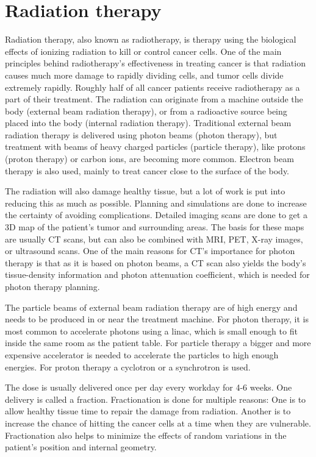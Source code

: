 \documentclass[../main/thesis.tex]{subfiles}
\begin{document}
\section{Radiation therapy}
\label{t-therapy}
Radiation therapy, also known as radiotherapy, is therapy using the biological effects of ionizing radiation to kill or control cancer cells. One of the main principles behind radiotherapy's effectiveness in treating cancer is that radiation causes much more damage to rapidly dividing cells, and tumor cells divide extremely rapidly. \citep[chap. 45]{Serway} Roughly half of all cancer patients receive radiotherapy as a part of their treatment. The radiation can originate from a machine outside the body (external beam radiation therapy), or from a radioactive source being placed into the body (internal radiation therapy). Traditional external beam radiation therapy is delivered using photon beams (photon therapy), but treatment with beams of heavy charged particles (particle therapy), like protons (proton therapy) or carbon ions, are becoming more common. Electron beam therapy is also used, mainly to treat cancer close to the surface of the body. \citep{nih}

The radiation will also damage healthy tissue, but a lot of work is put into reducing this as much as possible. Planning and simulations are done to increase the certainty of avoiding complications. Detailed imaging scans are done to get a 3D map of the patient's tumor and surrounding areas. The basis for these maps are usually \gls{CT} scans, but can also be combined with \gls{MRI}, \gls{PET}, X-ray images, or ultrasound scans. \citep{nih} One of the main reasons for \gls{CT}'s importance for photon therapy is that as it is based on photon beams, a \gls{CT} scan also yields the body's tissue-density information and photon attenuation coefficient, which is needed for photon therapy planning.  \citep[chap. 12]{Khan}

The particle beams of external beam radiation therapy are of high energy and needs to be produced in or near the treatment machine. For photon therapy, it is most common to accelerate photons using a \gls{linac}, which is small enough to fit inside the same room as the patient table. \citep{nih} For particle therapy a bigger and more expensive accelerator is needed to accelerate the particles to high enough energies. For proton therapy a cyclotron or a synchrotron is used. \citep[chap. 27]{Khan}

The dose is usually delivered once per day every workday for 4-6 weeks. One delivery is called a fraction. Fractionation is done for multiple reasons: One is to allow healthy tissue time to repair the damage from radiation. Another is to increase the chance of hitting the cancer cells at a time when they are vulnerable. Fractionation also helps to minimize the effects of random variations in the patient's position and internal geometry. \citep{fractionation} \citep{hysing-uncertain}
\end{document}
